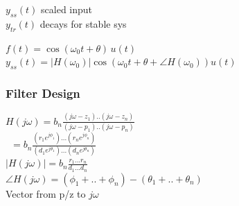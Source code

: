 \documentclass[4pt]{article}
\theoremstyle{definition}
\theoremstyle{definition}
\renewcommand{\o}{\omega}
\begin{document}
\begin{landscape}
\begin{multicols}{3}
    $y_{ss}(t)$ scaled input\\
    $y_{tr}(t)$ decays for stable sys

    \(f(t) = \cos(\o_0 t + \theta) \, u(t)\)\\
    \(y_{ss}(t) = |H(\o_0)| \cos(\o_0 t + \theta + \angle H(\o_0)) u(t)\)

\subsubsection*{Filter Design}
    \(H(j\o) = b_n \frac{(j\o-z_1)..(j\o-z_n)}{(j\o-p_1)..(j\o-p_n)}\)\\\
    \(= b_n \frac{(r_1 e^{j\phi_1})...(r_n e^{j\phi_n})}{(d_1 e^{j\theta_1})... (d_n e^{j\theta_n})}\)\\
    \(|H(j\o)| = b_n \frac{r_1 ... r_n}{d_1 ... d_n}\)\\
    \(\angle H(j\o) = (\phi_1 + .. + \phi_n) - (\theta_1 + .. + \theta_n)\)\\

    Vector from p/z to $j\o$
\end{multicols}
\end{landscape}
\end{document}
